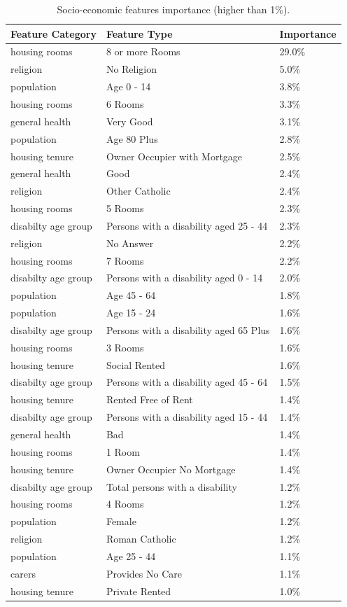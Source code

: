 \documentclass[conference,final,]{IEEEtran}
\begin{document}
\begin{table}

\caption{\label{tab:census-features-table}Socio-economic features importance (higher than 1\%).}
\centering
\fontsize{8}{10}\selectfont
\begin{tabular}[t]{lll}
\toprule
Feature Category & Feature Type & Importance\\
\midrule
housing rooms & 8 or more Rooms & 29.0\%\\
religion & No Religion & 5.0\%\\
population & Age 0 - 14 & 3.8\%\\
housing rooms & 6 Rooms & 3.3\%\\
general health & Very Good & 3.1\%\\
population & Age 80 Plus & 2.8\%\\
housing tenure & Owner Occupier with Mortgage & 2.5\%\\
general health & Good & 2.4\%\\
religion & Other Catholic & 2.4\%\\
housing rooms & 5 Rooms & 2.3\%\\
disabilty age group & Persons with a disability aged 25 - 44 & 2.3\%\\
religion & No Answer & 2.2\%\\
housing rooms & 7 Rooms & 2.2\%\\
disabilty age group & Persons with a disability aged 0 - 14 & 2.0\%\\
population & Age 45 - 64 & 1.8\%\\
population & Age 15 - 24 & 1.6\%\\
disabilty age group & Persons with a disability aged 65 Plus & 1.6\%\\
housing rooms & 3 Rooms & 1.6\%\\
housing tenure & Social Rented & 1.6\%\\
disabilty age group & Persons with a disability aged 45 - 64 & 1.5\%\\
housing tenure & Rented Free of Rent & 1.4\%\\
disabilty age group & Persons with a disability aged 15 - 44 & 1.4\%\\
general health & Bad & 1.4\%\\
housing rooms & 1 Room & 1.4\%\\
housing tenure & Owner Occupier No Mortgage & 1.4\%\\
disabilty age group & Total persons with a disability & 1.2\%\\
housing rooms & 4 Rooms & 1.2\%\\
population & Female & 1.2\%\\
religion & Roman Catholic & 1.2\%\\
population & Age 25 - 44 & 1.1\%\\
carers & Provides No Care & 1.1\%\\
housing tenure & Private Rented & 1.0\%\\
\bottomrule
\end{tabular}
\end{table}
\end{document}

